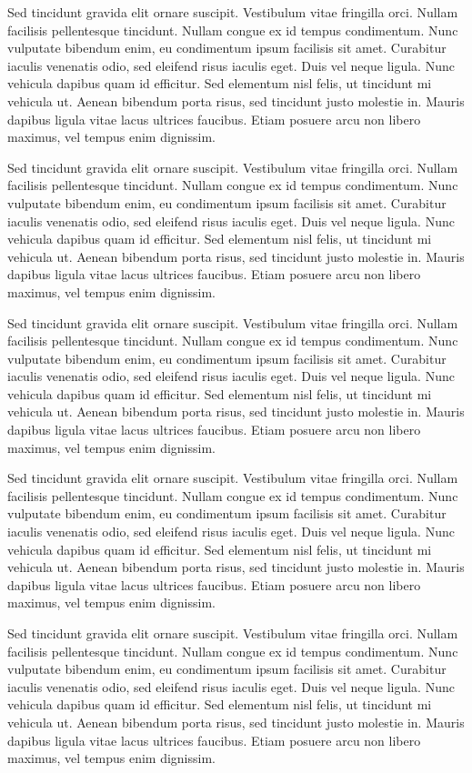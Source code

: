 Sed tincidunt gravida elit ornare suscipit. Vestibulum vitae fringilla orci. Nullam facilisis pellentesque tincidunt. Nullam congue ex id tempus condimentum. Nunc vulputate bibendum enim, eu condimentum ipsum facilisis sit amet. Curabitur iaculis venenatis odio, sed eleifend risus iaculis eget. Duis vel neque ligula. Nunc vehicula dapibus quam id efficitur. Sed elementum nisl felis, ut tincidunt mi vehicula ut. Aenean bibendum porta risus, sed tincidunt justo molestie in. Mauris dapibus ligula vitae lacus ultrices faucibus. Etiam posuere arcu non libero maximus, vel tempus enim dignissim. \par
Sed tincidunt gravida elit ornare suscipit. Vestibulum vitae fringilla orci. Nullam facilisis pellentesque tincidunt. Nullam congue ex id tempus condimentum. Nunc vulputate bibendum enim, eu condimentum ipsum facilisis sit amet. Curabitur iaculis venenatis odio, sed eleifend risus iaculis eget. Duis vel neque ligula. Nunc vehicula dapibus quam id efficitur. Sed elementum nisl felis, ut tincidunt mi vehicula ut. Aenean bibendum porta risus, sed tincidunt justo molestie in. Mauris dapibus ligula vitae lacus ultrices faucibus. Etiam posuere arcu non libero maximus, vel tempus enim dignissim. \par
Sed tincidunt gravida elit ornare suscipit. Vestibulum vitae fringilla orci. Nullam facilisis pellentesque tincidunt. Nullam congue ex id tempus condimentum. Nunc vulputate bibendum enim, eu condimentum ipsum facilisis sit amet. Curabitur iaculis venenatis odio, sed eleifend risus iaculis eget. Duis vel neque ligula. Nunc vehicula dapibus quam id efficitur. Sed elementum nisl felis, ut tincidunt mi vehicula ut. Aenean bibendum porta risus, sed tincidunt justo molestie in. Mauris dapibus ligula vitae lacus ultrices faucibus. Etiam posuere arcu non libero maximus, vel tempus enim dignissim. \par
Sed tincidunt gravida elit ornare suscipit. Vestibulum vitae fringilla orci. Nullam facilisis pellentesque tincidunt. Nullam congue ex id tempus condimentum. Nunc vulputate bibendum enim, eu condimentum ipsum facilisis sit amet. Curabitur iaculis venenatis odio, sed eleifend risus iaculis eget. Duis vel neque ligula. Nunc vehicula dapibus quam id efficitur. Sed elementum nisl felis, ut tincidunt mi vehicula ut. Aenean bibendum porta risus, sed tincidunt justo molestie in. Mauris dapibus ligula vitae lacus ultrices faucibus. Etiam posuere arcu non libero maximus, vel tempus enim dignissim. \par
Sed tincidunt gravida elit ornare suscipit. Vestibulum vitae fringilla orci. Nullam facilisis pellentesque tincidunt. Nullam congue ex id tempus condimentum. Nunc vulputate bibendum enim, eu condimentum ipsum facilisis sit amet. Curabitur iaculis venenatis odio, sed eleifend risus iaculis eget. Duis vel neque ligula. Nunc vehicula dapibus quam id efficitur. Sed elementum nisl felis, ut tincidunt mi vehicula ut. Aenean bibendum porta risus, sed tincidunt justo molestie in. Mauris dapibus ligula vitae lacus ultrices faucibus. Etiam posuere arcu non libero maximus, vel tempus enim dignissim. \par
